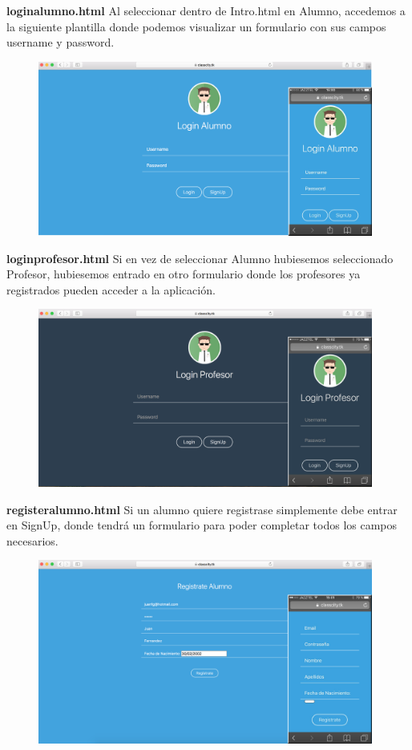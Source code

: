 \item \textbf{loginalumno.html} Al seleccionar dentro de Intro.html en Alumno, accedemos a la siguiente plantilla donde podemos visualizar un formulario con sus campos username y password.

\begin{figure}[H]
    \centering
    \includegraphics[width=110mm]{memoria/LaTeX/img/templates/loginalumno.png}
\end{figure}


\item \textbf{loginprofesor.html} Si en vez de seleccionar Alumno hubiesemos seleccionado Profesor, hubiesemos entrado en otro formulario donde los profesores ya registrados pueden acceder a la aplicación.

\begin{figure}[H]
    \centering
    \includegraphics[width=110mm]{memoria/LaTeX/img/templates/loginprofesor.png}
\end{figure}

\item \textbf{registeralumno.html} Si un alumno quiere registrase simplemente debe entrar en SignUp, donde tendrá un formulario para poder completar todos los campos necesarios. 
\begin{figure}[H]
    \centering
    \includegraphics[width=110mm]{memoria/LaTeX/img/templates/registeralumno.png}
\end{figure}

